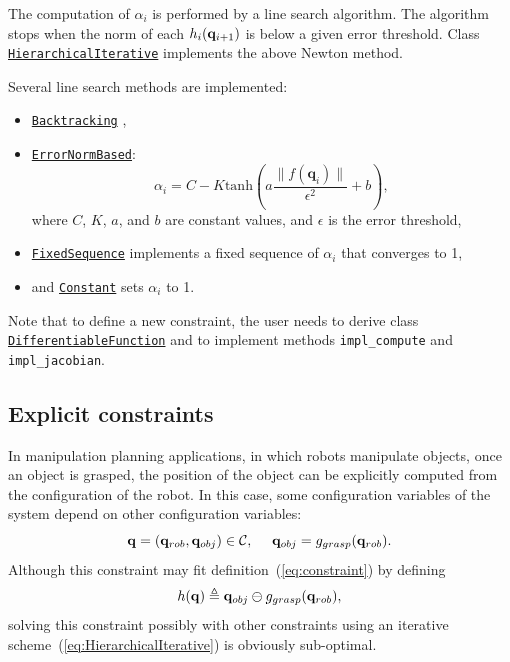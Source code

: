 The computation of $\alpha_i$ is performed by a line search algorithm.
The algorithm stops when the norm of each $h_i(\mathbf{q}_{i+1})$ is below a given error threshold.
Class\\ \href{https://gepettoweb.laas.fr/hpp/hpp-constraints/doxygen-html/classhpp_1_1constraints_1_1solver_1_1HierarchicalIterative.html}{\texttt{HierarchicalIterative}} implements the above Newton method.
{\color{blue}
Several line search methods are implemented:
\begin{itemize}
\item \href{https://gepettoweb.laas.fr/hpp/hpp-constraints/doxygen-html/structhpp_1_1constraints_1_1solver_1_1lineSearch_1_1Backtracking.html}{\texttt{Backtracking}} \cite{backtracking},
\item \href{https://gepettoweb.laas.fr/hpp/hpp-constraints/doxygen-html/structhpp_1_1constraints_1_1solver_1_1lineSearch_1_1ErrorNormBased.html}{\texttt{ErrorNormBased}}:
  $$\alpha_{i} = C - K  \text{tanh}(a \frac{\|f(\mathbf{q}_i)\|}{\epsilon^2} + b),$$
  where $C$, $K$, $a$, and $b$ are constant values, and $\epsilon$ is the
  error threshold,
\item \href{https://gepettoweb.laas.fr/hpp/hpp-constraints/doxygen-html/structhpp_1_1constraints_1_1solver_1_1lineSearch_1_1FixedSequence.html}{\texttt{FixedSequence}} implements a fixed sequence of $\alpha_i$ that converges to 1,
\item and \href{https://gepettoweb.laas.fr/hpp/hpp-constraints/doxygen-html/structhpp_1_1constraints_1_1solver_1_1lineSearch_1_1Constant.html}{\texttt{Constant}} sets $\alpha_i$ to 1.
\end{itemize}
}
Note that to define a new constraint, the user needs to derive class \href{https://gepettoweb.laas.fr/hpp/hpp-constraints/doxygen-html/classhpp_1_1constraints_1_1DifferentiableFunction.html}{\texttt{DifferentiableFunction}} and to implement methods \texttt{impl\_compute} and \texttt{impl\_jacobian}.

\subsection{Explicit constraints}

In manipulation planning applications, in which robots manipulate objects, once an object is grasped, the position of the object can be explicitly computed from the configuration of the robot. In this case, some configuration variables of the system depend on other configuration variables:
$$
\conf=(\conf_{rob},\conf_{obj})\in\CS,\ \ \ \ \conf_{obj} = g_{grasp}(\conf_{rob}).
$$
Although this constraint may fit definition~(\ref{eq:constraint}) by defining
\begin{equation}\label{eq:explicit-grasp}
h(\conf) \triangleq \conf_{obj} \ominus g_{grasp}(\conf_{rob}),
\end{equation}
solving this constraint possibly with other constraints using an iterative scheme~(\ref{eq:HierarchicalIterative}) is obviously sub-optimal.

